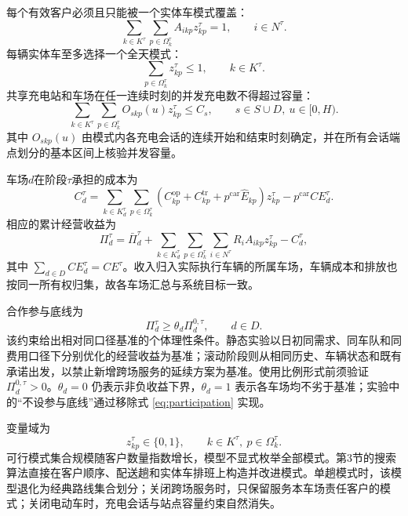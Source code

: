 \documentclass{setp-new}
\begin{document}
每个有效客户必须且只能被一个实体车模式覆盖：
\begin{equation}
\sum_{k\in K^\tau}\sum_{p\in\Omega_k^\tau}A_{ikp}z_{kp}^\tau=1,
\qquad i\in N^\tau .
\label{eq:service_once}
\end{equation}
每辆实体车至多选择一个全天模式：
\begin{equation}
\sum_{p\in\Omega_k^\tau}z_{kp}^\tau\le1,
\qquad k\in K^\tau .
\label{eq:vehicle_pattern}
\end{equation}
共享充电站和车场在任一连续时刻的并发充电数不得超过容量：
\begin{equation}
\sum_{k\in K^\tau}\sum_{p\in\Omega_k^\tau}O_{skp}(u)z_{kp}^\tau\le C_s,
\qquad s\in S\cup D,\ u\in[0,H) .
\label{eq:station_capacity}
\end{equation}
其中 $O_{skp}(u)$ 由模式内各充电会话的连续开始和结束时刻确定，并在所有会话端点划分的基本区间上核验并发容量。

车场$d$在阶段$\tau$承担的成本为
\begin{equation}
C_d^\tau=\sum_{k\in K_d^\tau}\sum_{p\in\Omega_k^\tau}
\left(C_{kp}^{\mathrm{op}}+C_{kp}^{\mathrm{tr}}+p^{\mathrm{car}}\widehat E_{kp}\right)z_{kp}^\tau-p^{\mathrm{car}}CE_d^\tau.
\label{eq:depot-cost}
\end{equation}
相应的累计经营收益为
\begin{equation}
\Pi_d^\tau=\bar\Pi_d^\tau+
\sum_{k\in K_d^\tau}\sum_{p\in\Omega_k^\tau}
\sum_{i\in N^\tau}R_iA_{ikp}z_{kp}^\tau-C_d^\tau,
\label{eq:profit}
\end{equation}
其中 $\sum_{d\in D}CE_d^\tau=CE^\tau$。收入归入实际执行车辆的所属车场，车辆成本和排放也按同一所有权归集，故各车场汇总与系统目标一致。

合作参与底线为
\begin{equation}
\Pi_d^\tau\ge\theta_d\Pi_d^{0,\tau},
\qquad d\in D .
\label{eq:participation}
\end{equation}
该约束给出相对同口径基准的个体理性条件。静态实验以日初同需求、同车队和同费用口径下分别优化的经营收益为基准；滚动阶段则从相同历史、车辆状态和既有承诺出发，以禁止新增跨场服务的延续方案为基准。使用比例形式前须验证 $\Pi_d^{0,\tau}>0$。$\theta_d=0$ 仍表示非负收益下界，$\theta_d=1$ 表示各车场均不劣于基准；实验中的“不设参与底线”通过移除式 \eqref{eq:participation} 实现。

变量域为
\begin{equation}
z_{kp}^\tau\in\{0,1\},
\qquad k\in K^\tau,\ p\in\Omega_k^\tau .
\label{eq:binary}
\end{equation}
可行模式集合规模随客户数量指数增长，模型不显式枚举全部模式。第3节的搜索算法直接在客户顺序、配送趟和实体车排班上构造并改进模式。单趟模式时，该模型退化为经典路线集合划分；关闭跨场服务时，只保留服务本车场责任客户的模式；关闭电动车时，充电会话与站点容量约束自然消失。
\end{document}
